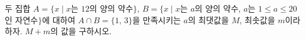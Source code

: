 두 집합 $A=\{x \mid x$는 $12$의 양의 약수$\}$, $B=\{x \mid x$는 $a$의 양의 약수, $a$는 $1\le a\le 20$인 자연수$\}$에 대하여 $A\cap B=\{1,\,3\}$을 만족시키는 $a$의 최댓값을 $M$, 최솟값을 $m$이라 하자. $M+m$의 값을 구하시오.
